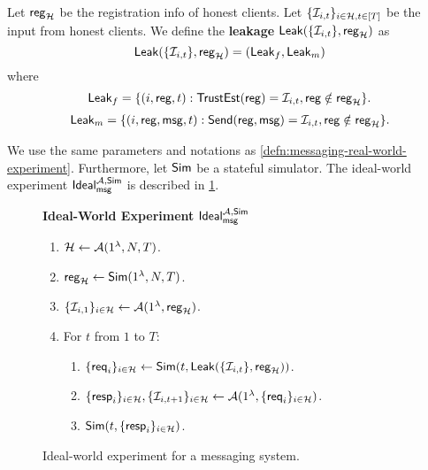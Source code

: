 \begin{definition}
\label{defn:messaging-leakage}
Let $\mathsf{reg}_{\mathcal{H}}$ be the registration info of honest clients. Let $\{\mathcal{I}_{i, t}\}_{i \in \mathcal{H}, t \in [T]}$ be the input from honest clients. We define the \textbf{leakage} $\mathsf{Leak}(\{\mathcal{I}_{i, t}\}, \mathsf{reg}_{\mathcal{H}})$ as
$$\mathsf{Leak}(\{\mathcal{I}_{i, t}\}, \mathsf{reg}_{\mathcal{H}}) = (\mathsf{Leak}_f, \mathsf{Leak}_m)$$
where
$$\mathsf{Leak}_f = \{(i, \mathsf{reg}, t): \mathsf{TrustEst}(\mathsf{reg}) = \mathcal{I}_{i, t}, \mathsf{reg} \notin \mathsf{reg}_{\mathcal{H}}\}.$$
\begin{align*}
\mathsf{Leak}_m = \{(i, \mathsf{reg}, \mathsf{msg}, t): \mathsf{Send}(\mathsf{reg}, \mathsf{msg}) = \mathcal{I}_{i, t}, \mathsf{reg} \notin \mathsf{reg}_{\mathcal{H}}\}.    
\end{align*}
\end{definition}
\begin{definition}
\label{defn:messaging-ideal-world-experiment}
We use the same parameters and notations as \cref{defn:messaging-real-world-experiment}. Furthermore, let $\mathsf{Sim}$ be a stateful simulator. The ideal-world experiment $\mathsf{Ideal}_{\mathsf{msg}}^{\mathcal{A}, \mathsf{Sim}}$ is described in \cref{expr:messaging-ideal-world}.
\begin{figure}[ht]
\begin{framed}
\textbf{Ideal-World Experiment }$\mathsf{Ideal}_{\mathsf{msg}}^{\mathcal{A}, \mathsf{Sim}}$
\begin{enumerate}
\item $\mathcal{H} \leftarrow \mathcal{A}(1^{\lambda}, N, T)$.
\item $\mathsf{reg}_{\mathcal{H}} \leftarrow \mathsf{Sim}(1^{\lambda}, N, T)$. 
\item $\{\mathcal{I}_{i, 1}\}_{i \in \mathcal{H}} \leftarrow \mathcal{A}(1^{\lambda}, \mathsf{reg}_{\mathcal{H}})$.
\item For $t$ from $1$ to $T$:
    \begin{enumerate}
    \item  $\{\mathsf{req}_i\}_{i \in \mathcal{H}} \leftarrow \mathsf{Sim}(t, \mathsf{Leak}(\{\mathcal{I}_{i, t}\}, \mathsf{reg}_{\mathcal{H}}))$.
    
    \item $\{\mathsf{resp}_i\}_{i \in \mathcal{H}}, \{\mathcal{I}_{i, t + 1}\}_{i \in \mathcal{H}} \leftarrow \mathcal{A}(1^{\lambda}, \{\mathsf{req}_i\}_{i \in \mathcal{H}})$.
    
    \item $\mathsf{Sim}(t, \{\mathsf{resp}_i\}_{i \in \mathcal{H}})$.
    \end{enumerate}
\end{enumerate}
\end{framed}
\caption{Ideal-world experiment for a messaging system.}
\label{expr:messaging-ideal-world}
\end{figure}

\end{definition}

